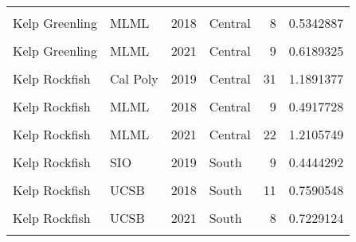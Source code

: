 \documentclass[
]{article}
\begin{document}
\begin{longtable}[t]{llrlrr}
\cellcolor{gray!6}{Kelp Greenling} & \cellcolor{gray!6}{HSU} & \cellcolor{gray!6}{2021} & \cellcolor{gray!6}{North} & \cellcolor{gray!6}{7} & \cellcolor{gray!6}{0.9252780}\\
Kelp Greenling & MLML & 2018 & Central & 8 & 0.5342887\\
\addlinespace
\cellcolor{gray!6}{Kelp Greenling} & \cellcolor{gray!6}{MLML} & \cellcolor{gray!6}{2019} & \cellcolor{gray!6}{Central} & \cellcolor{gray!6}{4} & \cellcolor{gray!6}{0.3783166}\\
Kelp Greenling & MLML & 2021 & Central & 9 & 0.6189325\\
\cellcolor{gray!6}{Kelp Rockfish} & \cellcolor{gray!6}{Cal Poly} & \cellcolor{gray!6}{2018} & \cellcolor{gray!6}{Central} & \cellcolor{gray!6}{26} & \cellcolor{gray!6}{0.6281969}\\
Kelp Rockfish & Cal Poly & 2019 & Central & 31 & 1.1891377\\
\cellcolor{gray!6}{Kelp Rockfish} & \cellcolor{gray!6}{Cal Poly} & \cellcolor{gray!6}{2021} & \cellcolor{gray!6}{Central} & \cellcolor{gray!6}{18} & \cellcolor{gray!6}{1.1932611}\\
\addlinespace
Kelp Rockfish & MLML & 2018 & Central & 9 & 0.4917728\\
\cellcolor{gray!6}{Kelp Rockfish} & \cellcolor{gray!6}{MLML} & \cellcolor{gray!6}{2019} & \cellcolor{gray!6}{Central} & \cellcolor{gray!6}{6} & \cellcolor{gray!6}{0.5102564}\\
Kelp Rockfish & MLML & 2021 & Central & 22 & 1.2105749\\
\cellcolor{gray!6}{Kelp Rockfish} & \cellcolor{gray!6}{SIO} & \cellcolor{gray!6}{2018} & \cellcolor{gray!6}{South} & \cellcolor{gray!6}{46} & \cellcolor{gray!6}{0.9563716}\\
Kelp Rockfish & SIO & 2019 & South & 9 & 0.4444292\\
\addlinespace
\cellcolor{gray!6}{Kelp Rockfish} & \cellcolor{gray!6}{SIO} & \cellcolor{gray!6}{2021} & \cellcolor{gray!6}{South} & \cellcolor{gray!6}{5} & \cellcolor{gray!6}{0.6333333}\\
Kelp Rockfish & UCSB & 2018 & South & 11 & 0.7590548\\
\cellcolor{gray!6}{Kelp Rockfish} & \cellcolor{gray!6}{UCSB} & \cellcolor{gray!6}{2019} & \cellcolor{gray!6}{South} & \cellcolor{gray!6}{17} & \cellcolor{gray!6}{0.5615385}\\
Kelp Rockfish & UCSB & 2021 & South & 8 & 0.7229124\\
\cellcolor{gray!6}{Lingcod} & \cellcolor{gray!6}{BML} & \cellcolor{gray!6}{2018} & \cellcolor{gray!6}{North} & \cellcolor{gray!6}{60} & \cellcolor{gray!6}{0.6923468}\\

\end{longtable}
\end{document}
